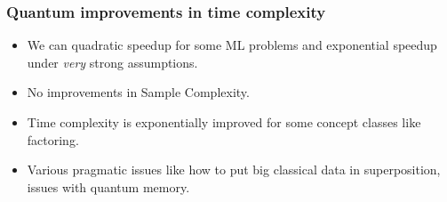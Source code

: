 \documentclass{beamer}
\begin{document}
\begin{frame}
\frametitle{Quantum improvements in time complexity}
    \begin{itemize}
        \item We can quadratic speedup for some ML problems
        and exponential speedup under \textit{very} strong assumptions.

        \item No improvements in Sample Complexity.
        \item Time complexity is exponentially improved for
        some concept classes like factoring.

        \item Various pragmatic issues like how to put big 
        classical data in superposition, issues with quantum memory.

    \end{itemize}
\end{frame}
\end{document}
